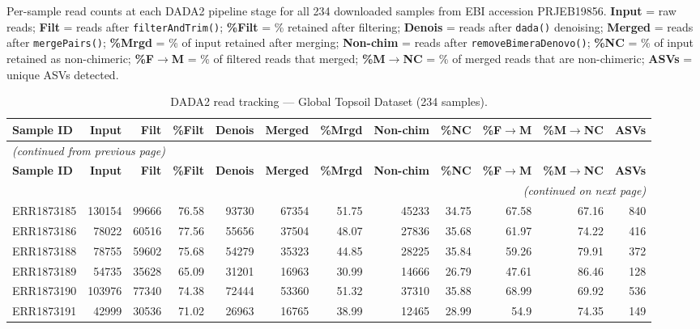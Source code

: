 \documentclass[12pt, oneside]{report}
\begin{document}
Per-sample read counts at each DADA2 pipeline stage for all 234 downloaded samples
from EBI accession PRJEB19856. \textbf{Input} = raw reads;
\textbf{Filt} = reads after \texttt{filterAndTrim()};
\textbf{\%Filt} = \% retained after filtering;
\textbf{Denois} = reads after \texttt{dada()} denoising;
\textbf{Merged} = reads after \texttt{mergePairs()};
\textbf{\%Mrgd} = \% of input retained after merging;
\textbf{Non-chim} = reads after \texttt{removeBimeraDenovo()};
\textbf{\%NC} = \% of input retained as non-chimeric;
\textbf{\%F$\to$M} = \% of filtered reads that merged;
\textbf{\%M$\to$NC} = \% of merged reads that are non-chimeric;
\textbf{ASVs} = unique ASVs detected.

\begingroup\fontsize{7}{9}\selectfont
\begin{longtable}{@{}p{3.2cm}rrrrrrrrrrr@{}}
\caption[DADA2 read tracking --- Global Topsoil]{DADA2 read tracking --- Global Topsoil Dataset (234 samples).}
\label{tab:supp1} \\
\toprule
\textbf{Sample ID} & \textbf{Input} & \textbf{Filt} & \textbf{\%Filt} &
\textbf{Denois} & \textbf{Merged} & \textbf{\%Mrgd} &
\textbf{Non-chim} & \textbf{\%NC} & \textbf{\%F$\to$M} &
\textbf{\%M$\to$NC} & \textbf{ASVs} \\
\midrule
\endfirsthead
\multicolumn{12}{l}{\small\itshape(continued from previous page)} \\[2pt]
\toprule
\textbf{Sample ID} & \textbf{Input} & \textbf{Filt} & \textbf{\%Filt} &
\textbf{Denois} & \textbf{Merged} & \textbf{\%Mrgd} &
\textbf{Non-chim} & \textbf{\%NC} & \textbf{\%F$\to$M} &
\textbf{\%M$\to$NC} & \textbf{ASVs} \\
\midrule
\endhead
\midrule
\multicolumn{12}{r}{\small\itshape(continued on next page)} \\
\endfoot
\bottomrule
\endlastfoot
ERR1873185 & 130154 & 99666 & 76.58 & 93730 & 67354 & 51.75 & 45233 & 34.75 & 67.58 & 67.16 & 840 \\
ERR1873186 & 78022 & 60516 & 77.56 & 55656 & 37504 & 48.07 & 27836 & 35.68 & 61.97 & 74.22 & 416 \\
ERR1873188 & 78755 & 59602 & 75.68 & 54279 & 35323 & 44.85 & 28225 & 35.84 & 59.26 & 79.91 & 372 \\
ERR1873189 & 54735 & 35628 & 65.09 & 31201 & 16963 & 30.99 & 14666 & 26.79 & 47.61 & 86.46 & 128 \\
ERR1873190 & 103976 & 77340 & 74.38 & 72444 & 53360 & 51.32 & 37310 & 35.88 & 68.99 & 69.92 & 536 \\
ERR1873191 & 42999 & 30536 & 71.02 & 26963 & 16765 & 38.99 & 12465 & 28.99 & 54.9 & 74.35 & 149 \\

\end{longtable}
\end{document}
